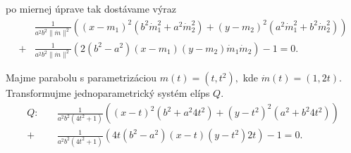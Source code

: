 po miernej úprave tak dostávame výraz
\begin{align*} 
&\frac{1}{a^2b^2\|\dot{m}\|^2} \left( (x - m_1)^2 \left( b^2 \dot{m}_1^2 + a^2 \dot{m}_2^2 \right) + (y - m_2)^2 \left( a^2 \dot{m}_1^2 + b^2 \dot{m}_2^2 \right) \right) \\
+ &\frac{1}{a^2b^2\|\dot{m}\|^2} \left( 2(b^2 - a^2)(x - m_1)(y - m_2)\dot{m}_1\dot{m}_2 \right) - 1 = 0.
\end{align*}

\begin{example}[Parabola]
Majme parabolu s parametrizáciou $m(t)=(t, t^2), $ kde $\dot{m}(t)=(1, 2t).$ Transformujme jednoparametrický systém elíps $Q$.
\begin{align*}
Q: \quad &\frac{1}{a^{2} b^{2}\left(4 t^{2} + 1\right)} \left( (x-t)^2 (b^2 + a^{2} 4t^2) + (y-t^2)^2 (a^2 + b^2 4t^2) \right)\\
+ &\frac{1}{a^{2} b^{2}\left(4 t^{2} + 1\right)} \left( 4t(b^2 - a^2)(x-t)(y-t^2)2t \right) - 1 = 0.
\end{align*}
\end{example}

